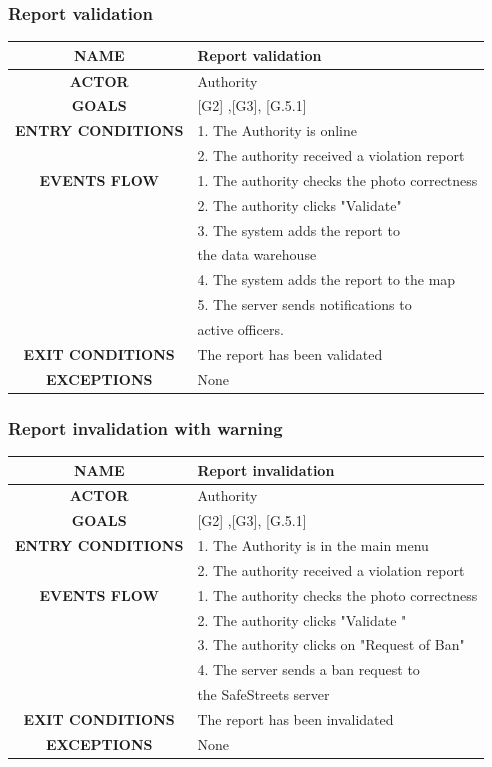 \documentclass[12pt,a4paper]{article}
\begin{document}
\subsubsection{Report validation}
		\begin{center}
			\begin{tabular}{| c | l |}
				\hline
				\textbf{NAME} & Report validation \\
				\hline
				\textbf{ACTOR} & Authority \\
				\hline
				\textbf{GOALS} & [G2] ,[G3], [G.5.1] \\
				\hline
				\textbf{ENTRY CONDITIONS} &1. The Authority is online \\
				&2. The authority received a violation report \\ \hline
				\textbf{EVENTS FLOW}  &
				1. The authority checks the photo correctness\\
				&2. The authority clicks "Validate" \\
				&3. The system adds the report to  \\
				& the data warehouse \\
				&4. The system adds the report to the map \\ 
				&5. The server sends notifications to \\
				& active officers. \\
				\hline
				\textbf{EXIT CONDITIONS}  & The report has been validated \\ \hline
				\textbf{EXCEPTIONS} & None \\
				\hline
			\end{tabular}
		\end{center}
\newpage
\subsubsection{Report invalidation with warning}
		\begin{center}
			\begin{tabular}{| c | l |}
				\hline
				\textbf{NAME} & Report invalidation \\
				\hline
				\textbf{ACTOR} & Authority \\
				\hline
				\textbf{GOALS} & [G2] ,[G3], [G.5.1] \\
				\hline
				\textbf{ENTRY CONDITIONS} &1. The Authority is in the main menu \\
				&2. The authority received a violation report \\ \hline
				\textbf{EVENTS FLOW}  &
				1. The authority checks the photo correctness\\
				&2. The authority clicks "Validate " \\
				&3. The authority clicks on "Request of Ban"  \\
				&4. The server sends a ban request to \\
				& the SafeStreets server \\
				\hline
				\textbf{EXIT CONDITIONS}  & The report has been invalidated \\ \hline
				\textbf{EXCEPTIONS} & None \\
				\hline
			\end{tabular}
		\end{center}
\newpage
\end{document}
